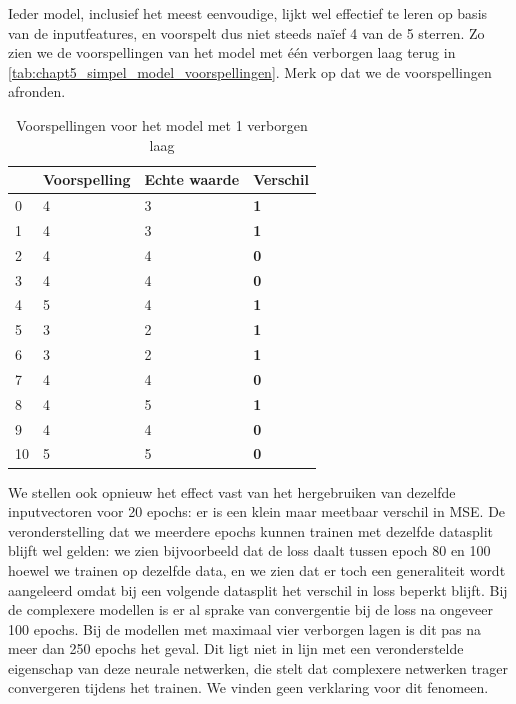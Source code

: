 Ieder model, inclusief het meest eenvoudige, lijkt wel effectief te leren op basis van de inputfeatures, en voorspelt dus niet steeds naïef 4 van de 5 sterren. Zo zien we de voorspellingen van het model met één verborgen laag terug in \autoref{tab:chapt5_simpel_model_voorspellingen}. Merk op dat we de voorspellingen afronden. 

\begin{table}[H]
    \centering
    \begin{tabular}{l|l|l|l}
       & Voorspelling & Echte waarde & Verschil   \\ \hline
    0  & 4            & 3            & \textbf{1} \\
    1  & 4            & 3            & \textbf{1} \\
    2  & 4            & 4            & \textbf{0} \\
    3  & 4            & 4            & \textbf{0} \\
    4  & 5            & 4            & \textbf{1} \\
    5  & 3            & 2            & \textbf{1} \\
    6  & 3            & 2            & \textbf{1} \\
    7  & 4            & 4            & \textbf{0} \\
    8  & 4            & 5            & \textbf{1} \\
    9  & 4            & 4            & \textbf{0} \\
    10 & 5            & 5            & \textbf{0}
    \end{tabular}
    \caption{Voorspellingen voor het model met 1 verborgen laag}
    \label{tab:chapt5_simpel_model_voorspellingen}
\end{table}




We stellen ook opnieuw het effect vast van het hergebruiken van dezelfde inputvectoren voor 20 epochs: er is een klein maar meetbaar verschil in MSE. De veronderstelling dat we meerdere epochs kunnen trainen met dezelfde datasplit blijft wel gelden: we zien bijvoorbeeld dat de loss daalt tussen epoch 80 en 100 hoewel we trainen op dezelfde data, en we zien dat er toch een generaliteit wordt aangeleerd omdat bij een volgende datasplit het verschil in loss beperkt blijft.\newline
Bij de complexere modellen is er al sprake van convergentie bij de loss na ongeveer 100 epochs. Bij de modellen met maximaal vier verborgen lagen is dit pas na meer dan 250 epochs het geval. Dit ligt niet in lijn met een veronderstelde eigenschap van deze neurale netwerken, die stelt dat complexere netwerken trager convergeren tijdens het trainen. We vinden geen verklaring voor dit fenomeen.


